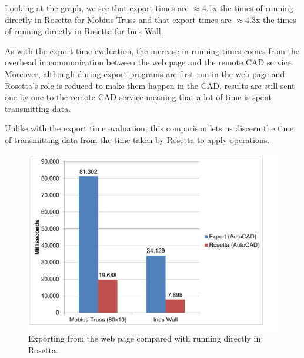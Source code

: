 Looking at the graph, we see that export times are $\approx$4.1x the times of running directly in Rosetta for Mobius Truss and that export times are $\approx$4.3x the times of running directly in Rosetta for Ines Wall.

As with the export time evaluation, the increase in running times comes from the overhead in communication between the web page and the remote CAD service.
Moreover, although during export programs are first run in the web page and Rosetta's role is reduced to make them happen in the CAD, results are still sent one by one to the remote CAD service meaning that a lot of time is spent transmitting data.

Unlike with the export time evaluation, this comparison lets us discern the time of transmitting data from the time taken by Rosetta to apply operations.

\begin{figure}
  \centering
  \includegraphics[width=12cm]{./images/export_vs_rosetta_chart}
  \caption{Exporting from the web page compared with running directly in Rosetta.}
  \label{fig:export:vs:rosetta}
\end{figure}



